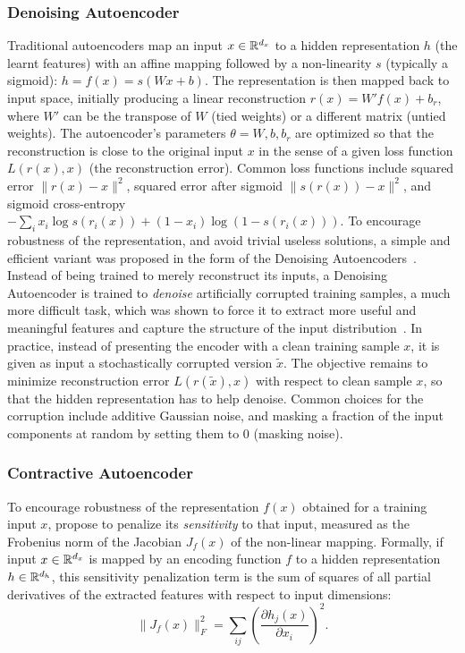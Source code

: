 \subsubsection{Denoising Autoencoder}
Traditional autoencoders map an input $x \in \mathbb{R}^{d_x}$ to a hidden
representation $h$ (the learnt features) with an affine mapping followed by a non-linearity $s$
(typically a sigmoid): $h = f(x) = s(Wx+b)$. The representation is then mapped back to
input space, initially producing a linear reconstruction $r(x)=W'f(x)+b_r$, where $W'$ can
be the transpose of $W$ (tied weights) or a different matrix (untied
weights).  The autoencoder's parameters $\theta={W,b,b_r}$ are optimized so
that the reconstruction is close to the original input $x$ in the sense of
a given loss function $L(r(x),x)$ (the reconstruction error). 
Common loss functions include squared error
$\|r(x)-x\|^2$, squared error after sigmoid $\|s(r(x))-x\|^2$, and sigmoid
cross-entropy $-\sum_i x_i \log s(r_i(x)) + (1-x_i) \log(1-s(r_i(x)))$.
To encourage robustness of the representation, and avoid trivial useless
solutions, a simple and efficient
variant was proposed in the form of the Denoising
Autoencoders~\citep{VincentPLarochelleH2008,Vincent-JMLR-2010}. 
Instead of being trained to merely reconstruct its inputs, a Denoising
Autoencoder is trained to \emph{denoise} artificially corrupted training samples, 
a much more difficult task, which was shown to force it to extract more
useful and meaningful features and capture the structure of the
input distribution~\citep{Vincent-JMLR-2010}. In practice, 
instead of presenting the encoder with a clean training sample $x$, it is given
as input a stochastically corrupted version $\tilde{x}$. The objective
remains to minimize reconstruction error $L(r(\tilde{x}),x)$ with respect to clean sample
$x$, so that the hidden representation has to help denoise.  
Common choices for the corruption include additive Gaussian noise, and
masking a fraction of the input components at random by setting them to 0
(masking noise).

\subsubsection{Contractive Autoencoder}
To encourage robustness of the representation $f(x)$ obtained for a training
input $x$, \cite{Rifai+al-2011} propose to penalize its {\em sensitivity} to
that input, measured as the Frobenius norm of the Jacobian $J_f(x)$
of the non-linear mapping. Formally, if input $x \in \mathbb{R}^{d_x}$ is mapped by an encoding
function $f$ to a hidden representation $h \in \mathbb{R}^{d_h}$, this sensitivity
penalization term is the sum of squares of all partial derivatives of the
extracted features with respect to input dimensions: \begin{equation}
\nonumber\|J_f(x)\|_F^2 = \sum_{ij} \left( \frac{\partial h_j(x)}{\partial x_i}
\right)^2.  \label{eq:sensitivity} \end{equation}

